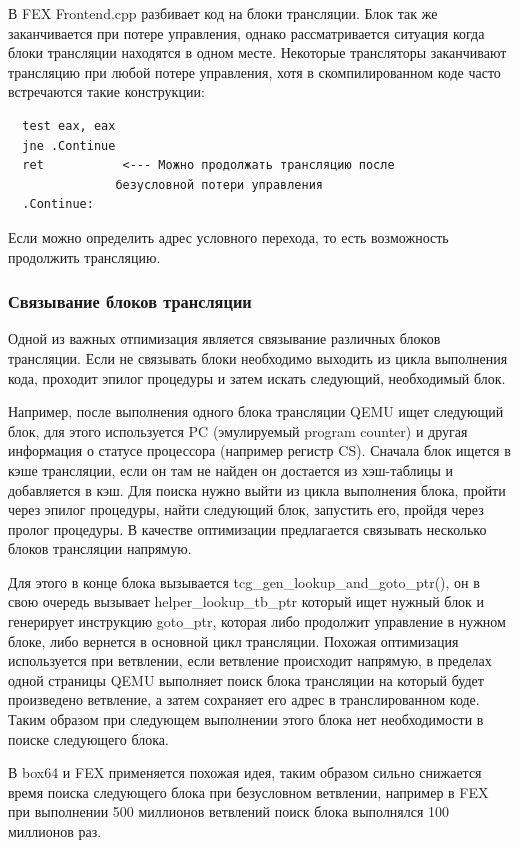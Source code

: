 В FEX Frontend.cpp разбивает код на блоки трансляции. Блок так же заканчивается при потере управления, однако рассматривается ситуация когда блоки трансляции находятся в одном месте. Некоторые трансляторы заканчивают трансляцию при любой потере управления, хотя в скомпилированном коде часто встречаются такие конструкции:
\begin{Verbatim}
  test eax, eax
  jne .Continue
  ret           <--- Можно продолжать трансляцию после 
  	           безусловной потери управления
  .Continue:
\end{Verbatim}

Если можно определить адрес условного перехода, то есть возможность продолжить трансляцию. \cite{fex_front}

\subsubsection{Связывание блоков трансляции}

Одной из важных отпимизация является связывание различных блоков трансляции. Если не связывать блоки необходимо выходить из цикла выполнения кода, проходит эпилог процедуры и затем искать следующий, необходимый блок.

Например, после выполнения одного блока трансляции QEMU ищет следующий блок, для этого используется PC (эмулируемый program counter) и другая информация о статусе процессора (например регистр CS). Сначала блок ищется в кэше трансляции, если он там не найден он достается из хэш-таблицы и добавляется в кэш. Для поиска нужно выйти из цикла выполнения блока, пройти через эпилог процедуры, найти следующий блок, запустить его, пройдя через пролог процедуры. В качестве оптимизации предлагается связывать несколько блоков трансляции напрямую.

Для этого в конце блока вызывается tcg\_gen\_lookup\_and\_goto\_ptr(), он в свою очередь вызывает helper\_lookup\_tb\_ptr который ищет нужный блок и генерирует инструкцию goto\_ptr, которая либо продолжит управление в нужном блоке, либо вернется в основной цикл трансляции. Похожая оптимизация используется при ветвлении, если ветвление происходит напрямую, в пределах одной страницы QEMU выполняет поиск блока трансляции на который будет произведено ветвление, а затем сохраняет его адрес в транслированном коде. Таким образом при следующем выполнении этого блока нет необходимости в поиске следующего блока. \cite{qemu_docs}

В box64 и FEX применяется похожая идея, таким образом сильно снижается время поиска следующего блока при безусловном ветвлении, например в FEX при выполнении 500 миллионов ветвлений поиск блока выполнялся 100 миллионов раз. \cite{fex_video}

